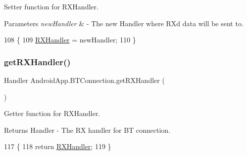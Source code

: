 Setter function for R\+X\+Handler. 


\begin{DoxyParams}{Parameters}
{\em new\+Handler} & -\/ The new Handler where RX\textquotesingle{}d data will be sent to. \\
\hline
\end{DoxyParams}

\begin{DoxyCode}
108                                                  \{
109         \hyperlink{class_android_app_1_1_b_t_connection_a4e3bfea96a4ddbd2cd2b76bb4ce8b871}{RXHandler} = newHandler;
110     \}
\end{DoxyCode}
\mbox{\label{class_android_app_1_1_b_t_connection_a2d2a381cb7cb2bcab1db0c804e85a32d}} 
\subsubsection{\texorpdfstring{get\+R\+X\+Handler()}{getRXHandler()}}
{\footnotesize\ttfamily Handler Android\+App.\+B\+T\+Connection.\+get\+R\+X\+Handler (\begin{DoxyParamCaption}{ }\end{DoxyParamCaption})\hspace{0.3cm}{\ttfamily [inline]}}



Getter function for R\+X\+Handler. 

\begin{DoxyReturn}{Returns}
Handler -\/ The RX handler for BT connection. 
\end{DoxyReturn}

\begin{DoxyCode}
117                                   \{
118         \textcolor{keywordflow}{return} \hyperlink{class_android_app_1_1_b_t_connection_a4e3bfea96a4ddbd2cd2b76bb4ce8b871}{RXHandler};
119     \}
\end{DoxyCode}
\mbox{\label{class_android_app_1_1_b_t_connection_a03907fd685748cb0da88a7f17d90885f}} 
